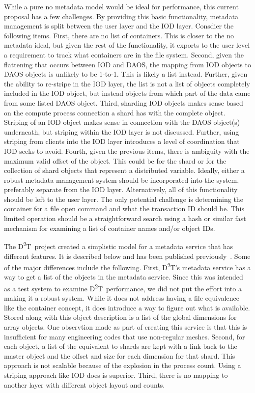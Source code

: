 \documentclass[conference]{sig-alt-gov2}
\newcommand{\DDT}{D\textsuperscript{2}T~}
\newcommand{\DDTns}{D\textsuperscript{2}T}
\begin{document}
While a pure no metadata model would be ideal for performance, this current
proposal has a few challenges. By providing this basic functionality, metadata
management is split between the user layer and the IOD layer. Consdier the
following items. First, there are no list of containers. This is closer to the
no metadata ideal, but given the rest of the functionality, it exports to the
user level a requirement to track what containers are in the file system.
Second, given the flattening that occurs between IOD and DAOS, the mapping from
IOD objects to DAOS objects is unlikely to be 1-to-1. This is likely a list
instead. Further, given the ability to re-stripe in the IOD layer, the list is
not a list of objects completely included in the IOD object, but instead
objects from which part of the data came from some listed DAOS object.  Third,
sharding IOD objects makes sense based on the compute process connection a
shard has with the complete object. Striping of an IOD object makes sense in
connection with the DAOS object(s) underneath, but striping within the IOD
layer is not discussed. Further, using striping from clients into the IOD layer
introduces a level of coordination that IOD seeks to avoid.  Fourth, given the
previous items, there is ambiguity with the maximum valid offset of the object.
This could be for the shard or for the collection of shard objects that
represent a distributed variable. Ideally, either a robust metadata management
system should be incorporated into the system, preferably separate from the IOD
layer. Alternatively, all of this functionality should be left to the user
layer. The only potential challenge is determining the container for a file
open command and what the transaction ID should be. This limited operation
should be a straightforward search using a hash or similar fast mechanism for
examining a list of container names and/or object IDs.

The \DDT project created a simplistic model for a metadata service that has
different features. It is described below and has been published
previously~\cite{lofstead:2012:txn-metadata}. Some of the major differences
include the following. First, \DDTns's metadata service has a way to get a list
of the objects in the metadata service. Since this was intended as a test
system to examine \DDT performance, we did not put the effort into a making it
a robust system. While it does not address having a file equivalence like the
container concept, it does introduce a way to figure out what is available.
Stored along with this object description is a list of the global dimensions
for array objects. One observtion made as part of creating this service is that
this is insufficient for many engineering codes that use non-regular meshes.
Second, for each object, a list of the equivalent to shards are kept with a
link back to the master object and the offset and size for each dimension for
that shard. This approach is not scalable because of the explosion in the
process count. Using a striping approach like IOD does is superior. Third,
there is no mapping to another layer with different object layout and counts.
\end{document}
